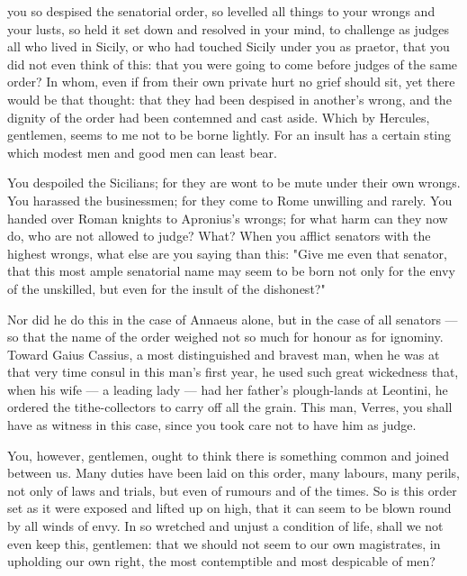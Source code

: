  you so despised the senatorial order, so levelled all things to your wrongs and your lusts, so held it set down and resolved in your mind, to challenge as judges all who lived in Sicily, or who had touched Sicily under you as praetor, that you did not even think of this: that you were going to come before judges of the same order? In whom, even if from their own private hurt no grief should sit, yet there would be that thought: that they had been despised in another's wrong, and the dignity of the order had been contemned and cast aside. Which by Hercules, gentlemen, seems to me not to be borne lightly. For an insult has a certain sting which modest men and good men can least bear.

 You despoiled the Sicilians; for they are wont to be mute under their own wrongs. You harassed the businessmen; for they come to Rome unwilling and rarely. You handed over Roman knights to Apronius's wrongs; for what harm can they now do, who are not allowed to judge? What? When you afflict senators with the highest wrongs, what else are you saying than this: "Give me even that senator, that this most ample senatorial name may seem to be born not only for the envy of the unskilled, but even for the insult of the dishonest?"

 Nor did he do this in the case of Annaeus alone, but in the case of all senators --- so that the name of the order weighed not so much for honour as for ignominy. Toward Gaius Cassius, a most distinguished and bravest man, when he was at that very time consul in this man's first year, he used such great wickedness that, when his wife --- a leading lady --- had her father's plough-lands at Leontini, he ordered the tithe-collectors to carry off all the grain. This man, Verres, you shall have as witness in this case, since you took care not to have him as judge.

 You, however, gentlemen, ought to think there is something common and joined between us. Many duties have been laid on this order, many labours, many perils, not only of laws and trials, but even of rumours and of the times. So is this order set as it were exposed and lifted up on high, that it can seem to be blown round by all winds of envy. In so wretched and unjust a condition of life, shall we not even keep this, gentlemen: that we should not seem to our own magistrates, in upholding our own right, the most contemptible and most despicable of men?

